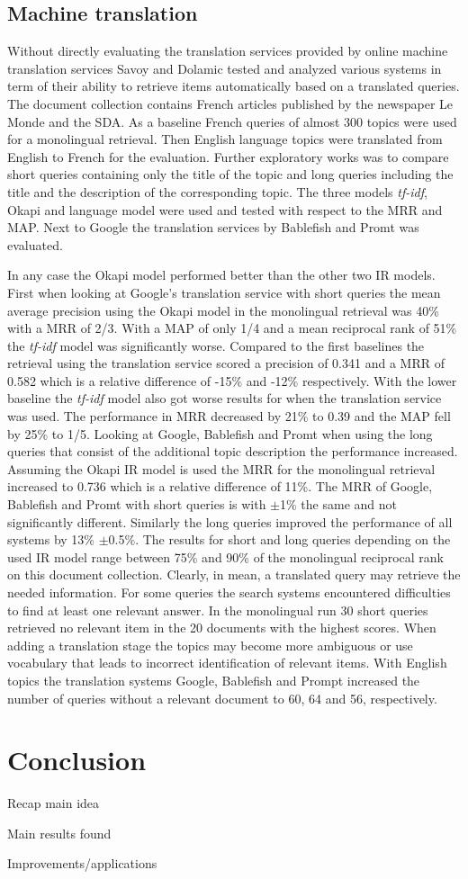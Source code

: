 \documentclass[journal]{IEEEtran}
\begin{document}
\subsection{Machine translation}
Without directly evaluating the translation services provided by online machine translation services Savoy and Dolamic \cite{savoy09} tested and analyzed various systems in term of their ability to retrieve items automatically based on a translated queries.
The document collection contains French articles published by the newspaper Le Monde and the SDA.
As a baseline French queries of almost 300 topics were used for a monolingual retrieval.
Then English language topics were translated from English to French for the evaluation.
Further exploratory works was to compare short queries containing only the title of the topic and long queries including the title and the description of the corresponding topic.
The three models \textit{tf-idf}, Okapi and language model were used and tested with respect to the MRR and MAP.
Next to Google the translation services by Bablefish and Promt was evaluated.

In any case the Okapi model performed better than the other two IR models.
First when looking at Google's translation service with short queries the mean average precision using the Okapi model in the monolingual retrieval was 40\% with a MRR of 2/3.
With a MAP of only 1/4 and a mean reciprocal rank of 51\% the \textit{tf-idf} model was significantly worse.
Compared to the first baselines the retrieval using the translation service scored a precision of 0.341 and a MRR of 0.582 which is a relative difference of -15\% and -12\% respectively.
With the lower baseline the \textit{tf-idf} model also got worse results for when the translation service was used.
The performance in MRR decreased by 21\% to 0.39 and the MAP fell by 25\% to 1/5.
Looking at Google, Bablefish and Promt when using the long queries that consist of the additional topic description the performance increased.
Assuming the Okapi IR model is used the MRR for the monolingual retrieval increased to 0.736 which is a relative difference of 11\%.
The MRR of Google, Bablefish and Promt with short queries is with $\pm$1\% the same and not significantly different.
Similarly the long queries improved the performance of all systems by 13\% $\pm$0.5\%.
The results for short and long queries depending on the used IR model range between 75\% and 90\% of the monolingual reciprocal rank on this document collection.
Clearly, in mean, a translated query may retrieve the needed information.
For some queries the search systems encountered difficulties to find at least one relevant answer.
In the monolingual run 30 short queries retrieved no relevant item in the 20 documents with the highest scores.
When adding a translation stage the topics may become more ambiguous or use vocabulary that leads to incorrect identification of relevant items.
With English topics the translation systems Google, Bablefish and Prompt increased the number of queries without a relevant document to 60, 64 and 56, respectively.



\section{Conclusion}
Recap main idea

Main results found

Improvements/applications





\end{document}
